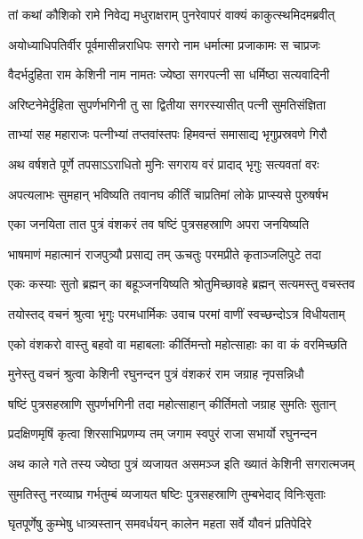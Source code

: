 
\twolineshloka
{तां कथां कौशिको रामे निवेद्य मधुराक्षराम्}
{पुनरेवापरं वाक्यं काकुत्स्थमिदमब्रवीत्} %

\twolineshloka
{अयोध्याधिपतिर्वीर पूर्वमासीन्नराधिपः}
{सगरो नाम धर्मात्मा प्रजाकामः स चाप्रजः} %

\twolineshloka
{वैदर्भदुहिता राम केशिनी नाम नामतः}
{ज्येष्ठा सगरपत्नी सा धर्मिष्ठा सत्यवादिनी} %

\twolineshloka
{अरिष्टनेमेर्दुहिता सुपर्णभगिनी तु सा}
{द्वितीया सगरस्यासीत् पत्नी सुमतिसंज्ञिता} %

\twolineshloka
{ताभ्यां सह महाराजः पत्नीभ्यां तप्तवांस्तपः}
{हिमवन्तं समासाद्य भृगुप्रस्रवणे गिरौ} %

\twolineshloka
{अथ वर्षशते पूर्णे तपसाऽऽराधितो मुनिः}
{सगराय वरं प्रादाद् भृगुः सत्यवतां वरः} %

\twolineshloka
{अपत्यलाभः सुमहान् भविष्यति तवानघ}
{कीर्तिं चाप्रतिमां लोके प्राप्स्यसे पुरुषर्षभ} %

\twolineshloka
{एका जनयिता तात पुत्रं वंशकरं तव}
{षष्टिं पुत्रसहस्राणि अपरा जनयिष्यति} %

\twolineshloka
{भाषमाणं महात्मानं राजपुत्र्यौ प्रसाद्य तम्}
{ऊचतुः परमप्रीते कृताञ्जलिपुटे तदा} %

\twolineshloka
{एकः कस्याः सुतो ब्रह्मन् का बहूञ्जनयिष्यति}
{श्रोतुमिच्छावहे ब्रह्मन् सत्यमस्तु वचस्तव} %

\twolineshloka
{तयोस्तद् वचनं श्रुत्वा भृगुः परमधार्मिकः}
{उवाच परमां वाणीं स्वच्छन्दोऽत्र विधीयताम्} %

\twolineshloka
{एको वंशकरो वास्तु बहवो वा महाबलाः}
{कीर्तिमन्तो महोत्साहाः का वा कं वरमिच्छति} %

\twolineshloka
{मुनेस्तु वचनं श्रुत्वा केशिनी रघुनन्दन}
{पुत्रं वंशकरं राम जग्राह नृपसन्निधौ} %

\twolineshloka
{षष्टिं पुत्रसहस्राणि सुपर्णभगिनी तदा}
{महोत्साहान् कीर्तिमतो जग्राह सुमतिः सुतान्} %

\twolineshloka
{प्रदक्षिणमृषिं कृत्वा शिरसाभिप्रणम्य तम्}
{जगाम स्वपुरं राजा सभार्यो रघुनन्दन} %

\twolineshloka
{अथ काले गते तस्य ज्येष्ठा पुत्रं व्यजायत}
{असमञ्ज इति ख्यातं केशिनी सगरात्मजम्} %

\twolineshloka
{सुमतिस्तु नरव्याघ्र गर्भतुम्बं व्यजायत}
{षष्टिः पुत्रसहस्राणि तुम्बभेदाद् विनिःसृताः} %

\twolineshloka
{घृतपूर्णेषु कुम्भेषु धात्र्यस्तान् समवर्धयन्}
{कालेन महता सर्वे यौवनं प्रतिपेदिरे} %

